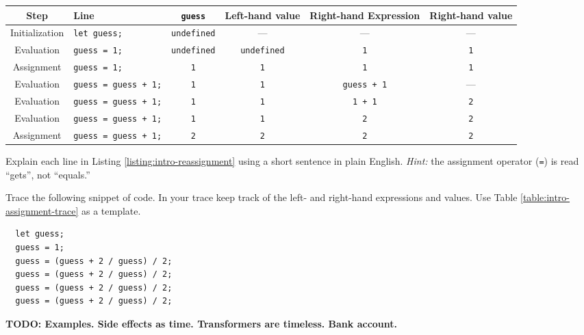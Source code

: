 \begin{table*}
  \small
  \sffamily
  \color{cyan}
  \begin{tabular}{c | l c|c|c c}
    Step & Line & \texttt{guess} & Left-hand value & Right-hand Expression & Right-hand value\\
    \hline
    Initialization & \texttt{let guess;} & \texttt{undefined} & --- & --- & --- \\
    Evaluation & \texttt{guess = 1;} & \texttt{undefined} & \texttt{undefined} & \texttt{1} & \texttt{1}\\
    Assignment & \texttt{guess = 1;} & \texttt{1} & \texttt{1} & \texttt{1} & \texttt{1}\\
    Evaluation & \texttt{guess = guess + 1;} & \texttt{1} & \texttt{1} & \texttt{guess + 1} &  --- \\
    Evaluation & \texttt{guess = guess + 1;} & \texttt{1} & \texttt{1} & \texttt{1 + 1} & \texttt{2}\\
    Evaluation & \texttt{guess = guess + 1;} & \texttt{1} & \texttt{1} & \texttt{2} & \texttt{2}\\
    Assignment & \texttt{guess = guess + 1;} & \texttt{2} & \texttt{2} & \texttt{2} & \texttt{2}
  \end{tabular}
  \caption{\label{table:intro-assignment-trace}A trace of the evaluation and assignment of a variable.}
\end{table*}

\begin{question}
  Explain each line in Listing \ref{listing:intro-reassignment} using a short sentence in plain English. \textit{Hint:} the assignment operator (\texttt{=}) is read ``gets'', not ``equals.''
\end{question}

\begin{question}
  Trace the following snippet of code. In your trace keep track of the left- and right-hand expressions and values. Use Table \ref{table:intro-assignment-trace} as a template.

  \begin{lstlisting}
  let guess;
  guess = 1;
  guess = (guess + 2 / guess) / 2;
  guess = (guess + 2 / guess) / 2;
  guess = (guess + 2 / guess) / 2;
  guess = (guess + 2 / guess) / 2;
  \end{lstlisting}
\end{question}

\textbf{TODO: Examples. Side effects as time. Transformers are timeless. Bank account.}

